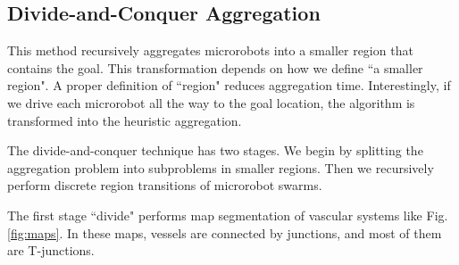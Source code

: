 \subsection{Divide-and-Conquer Aggregation} 
This method recursively aggregates microrobots into a smaller region that contains the goal. 
This transformation depends on how we define ``a smaller region". 
 A proper definition of ``region" reduces aggregation time.   
Interestingly, if we drive each microrobot all the way to the goal location, the algorithm is transformed into the heuristic aggregation.

The divide-and-conquer technique has two stages. 
We begin by splitting the aggregation problem into subproblems in smaller regions. 
Then we recursively perform discrete region transitions of microrobot swarms. 

The first stage ``divide" performs map segmentation of vascular systems like Fig. \ref{fig:maps}. 
In these maps, vessels are connected by junctions, and most of them are T-junctions. 

